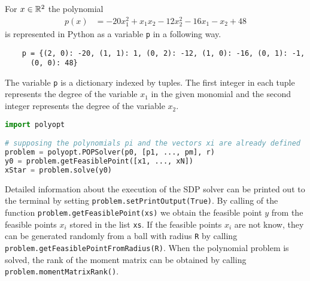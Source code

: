 \begin{example}
  For $x\in\mathbb{R}^2$ the polynomial
  \begin{align}
    p(x) &= -20x_1^2 + x_1x_2 -12x_2^2 -16x_1 -x_2 +48
  \end{align}
  is represented in Python as a variable \texttt{p} in a following way.
\begin{verbatim}
    p = {(2, 0): -20, (1, 1): 1, (0, 2): -12, (1, 0): -16, (0, 1): -1,
      (0, 0): 48}
\end{verbatim}
  The variable \texttt{p} is a dictionary indexed by tuples.
  The first integer in each tuple represents the degree of the variable $x_1$ in the given monomial and the second integer represents the degree of the variable $x_2$.
\end{example}

\begin{lstlisting}[language=python, caption={Typical usage of the class \texttt{POPSolver} of the Polyopt package.}, labellis={POP:opt:usage}]
import polyopt

# supposing the polynomials pi and the vectors xi are already defined
problem = polyopt.POPSolver(p0, [p1, ..., pm], r)
y0 = problem.getFeasiblePoint([x1, ..., xN])
xStar = problem.solve(y0)
\end{lstlisting}

Detailed information about the execution of the SDP solver can be printed out to the terminal by setting \texttt{problem.setPrintOutput(True)}.
By calling of the function \texttt{problem.getFeasiblePoint(xs)} we obtain the feasible point $y$ from the feasible points $x_i$ stored in the list \texttt{xs}.
If the feasible points $x_i$ are not know, they can be generated randomly from a ball with radius \texttt{R} by calling \texttt{problem.getFeasiblePointFromRadius(R)}.
When the polynomial problem is solved, the rank of the moment matrix can be obtained by calling \texttt{problem.momentMatrixRank()}.

